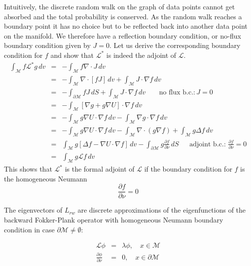 Intuitively, the discrete random walk on the graph of data points cannot get absorbed and the total probability is conserved. As the random walk reaches a boundary point it has no choice but to be reflected back into another data point on the manifold. We therefore have a reflection boundary condition, or no-flux boundary condition given by $J=0$. Let us derive the corresponding boundary condition for $f$ and show that $\mathcal{L}^*$ is indeed the adjoint of $\mathcal{L}$.
\begin{eqnarray*}
\int_{\mathcal{M}} f \mathcal{L}^* g \,dv &=& -\int_{\mathcal{M}} f \nabla \cdot J \,dv\\
&=& -\int_{\mathcal{M}} \nabla \cdot [fJ] \,dv + \int_{\mathcal{M}} J \cdot \nabla f \,dv \\
&=& -\int_{\partial \mathcal{M}} fJ\,dS + \int_{\mathcal{M}} J\cdot \nabla f \,dv ~~~~~~~~~\text{no flux b.c.:}\, J=0\\
&=& -\int_{\mathcal{M}} \left[\nabla g + g \nabla U \right] \cdot \nabla f \,dv \\
&=& -\int_{\mathcal{M}} g\nabla U \cdot \nabla f \,dv - \int_{\mathcal{M}}\nabla g \cdot \nabla f \, dv \\
&=& -\int_{\mathcal{M}} g\nabla U \cdot \nabla f \,dv - \int_{\mathcal{M}}\nabla\cdot(g\nabla f) + \int_{\mathcal{M}} g\Delta f\,dv \\
&=& \int_{\mathcal{M}} g\left[\Delta f - \nabla U \cdot \nabla f  \right]\,dv - \int_{\partial \mathcal{M}} g \frac{\partial f}{\partial \nu}\,dS ~~~~~~~\text{adjoint b.c.: } \frac{\partial f}{\partial \nu}=0 \\
&=& \int_{\mathcal{M}} g \mathcal{L} f \,dv
\end{eqnarray*}
This shows that $\mathcal{L}^*$ is the formal adjoint of $\mathcal{L}$ if the boundary condition for $f$ is the homogeneous Neumann
$$\frac{\partial f}{\partial \nu} = 0$$

The eigenvectors of $L_{rw}$ are discrete approximations of the eigenfunctions of the backward Fokker-Plank operator with homogeneous Neumann boundary condition in case $\partial \mathcal{M} \neq \emptyset$:

\begin{eqnarray*}
\mathcal{L}\phi &=& \lambda \phi,\quad x\in \mathcal{M}\\
\frac{\partial \phi}{\partial \nu} &=& 0,\quad x\in \partial \mathcal{M}
\end{eqnarray*}

